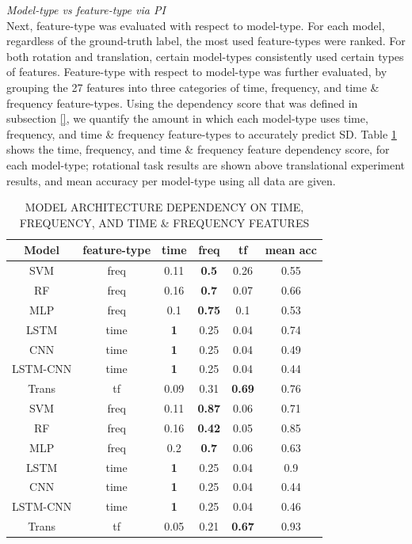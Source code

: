 \documentclass{ieeeaccess}
\begin{document}
\noindent \emph{Model-type vs feature-type via PI}\\
Next, feature-type was evaluated with respect to model-type. For each model, regardless of the ground-truth label, the most used feature-types were ranked. For both rotation and translation, certain model-types consistently used certain types of features. Feature-type with respect to model-type was further evaluated, by grouping the 27 features into three categories of time, frequency, and time \& frequency feature-types. Using the dependency score that was defined in subsection \ref{}, we quantify the amount in which each model-type uses time, frequency, and time \& frequency feature-types to accurately predict SD. Table \ref{table5} shows the time, frequency, and time \& frequency feature dependency score, for each model-type; rotational task results are shown above translational experiment results, and mean accuracy per model-type using all data are given.
\begin{table}[h!]
\caption{MODEL ARCHITECTURE DEPENDENCY ON TIME, FREQUENCY, AND TIME \& FREQUENCY FEATURES}
\label{table5}
\centering
\begin{tabular}{c|ccccc}
\hline
Model & feature-type & time & freq & tf & mean acc\\
\hline
SVM & freq & 0.11 & \textbf{0.5} & 0.26 & 0.55 \\
RF & freq & 0.16 & \textbf{0.7} & 0.07 & 0.66 \\
MLP & freq & 0.1 & \textbf{0.75} & 0.1 & 0.53 \\
LSTM & time & \textbf{1} & 0.25 & 0.04 & 0.74 \\
CNN & time & \textbf{1} & 0.25 & 0.04 & 0.49 \\
LSTM-CNN & time & \textbf{1} & 0.25 & 0.04 & 0.44 \\
Trans & tf & 0.09 & 0.31 & \textbf{0.69} & 0.76 \\
\hline
SVM & freq & 0.11 & \textbf{0.87} & 0.06 & 0.71 \\
RF & freq & 0.16 & \textbf{0.42} & 0.05 & 0.85 \\
MLP & freq & 0.2 & \textbf{0.7} & 0.06 & 0.63 \\
LSTM & time & \textbf{1} & 0.25 & 0.04 & 0.9 \\
CNN & time & \textbf{1} & 0.25 & 0.04 & 0.44 \\
LSTM-CNN & time & \textbf{1} & 0.25 & 0.04 & 0.46 \\
Trans & tf & 0.05 & 0.21 & \textbf{0.67} & 0.93 \\
\hline
\end{tabular}
\end{table}
\end{document}
